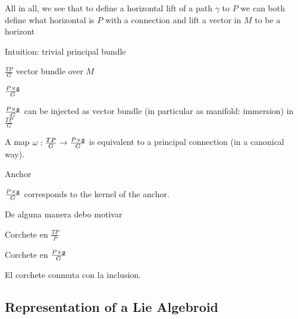 All in all, we see that to define a horizontal lift of a path $\gamma$ to $P$ we can both define what horizontal is $P$ with a connection and lift a vector in $M$ to be a horizont

Intuition: trivial principal bundle

\begin{definition}
$\frac{TP}{G}$ vector bundle over $M$
\end{definition}

\begin{definition}
$\frac{P \times \mathfrak{g}}{G}$
\end{definition}

\begin{proposition}
$\frac{P \times \mathfrak{g}}{G}$ can be injected as vector bundle (in particular as manifold: immersion) in $\frac{TP}{G}$
\end{proposition}

\begin{theorem}
A map $\omega:\frac{TP}{G} \to \frac{P \times \mathfrak{g}}{G}$ is equivalent to a principal connection (in a canonical way).
\end{theorem}

\begin{definition}
Anchor
\end{definition}

\begin{proposition}
$\frac{P \times \mathfrak{g}}{G}$ corresponds to the kernel of the anchor.
\end{proposition}

De alguna manera debo motivar 

\begin{definition}
Corchete en $\frac{TP}{P}$
\end{definition}

\begin{definition}
Corchete en $\frac{P \times \mathfrak{g}}{G}$
\end{definition}

\begin{proposition}
El corchete conmuta con la inclusion.
\end{proposition}




\subsection{Representation of a Lie Algebroid}

